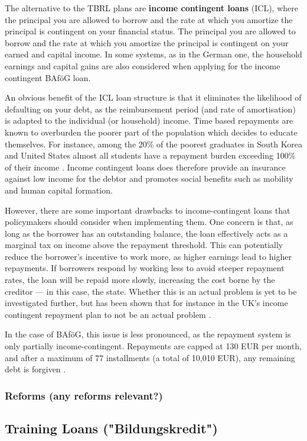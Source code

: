 The alternative to the TBRL plans are \textbf{income contingent loans} (ICL), where the 
principal you are allowed to borrow and the rate at which you amortize the principal is contingent on your financial status. The principal you are allowed to borrow and the 
rate at which you amortize the principal is contingent on your earned 
and capital income. In some systems, as in the German one, the household earnings 
and capital gains are also considered when applying for the income contingent BAföG loan.

An obvious benefit of the ICL loan structure is that it eliminates the likelihood 
of defaulting on your debt, as the reimbursement period 
(and rate of amortisation) is adapted to the individual (or household) income. 
Time based repayments are known to overburden the poorer part of the population which decides to 
educate themselves. For instance, among the 20\% of the poorest graduates in South Korea and United States 
almost all students have a repayment burden exceeding 100\% of their income 
\citep{chapman_income-contingent_2022}. 
Income contingent loans does therefore provide an insurance against low income for the debtor and promotes social benefits such as mobility and human capital formation.

However, there are some important drawbacks to income-contingent loans that policymakers should consider when implementing them. 
One concern is that, as long as the borrower has an outstanding balance, the loan effectively acts as a marginal tax on income above the repayment threshold. 
This can potentially reduce the borrower’s incentive to work more, as higher earnings lead to higher repayments. 
If borrowers respond by working less to avoid steeper repayment rates, the loan will be repaid more slowly, increasing the cost borne by the creditor — in this case, the state.
Whether this is an actual problem is yet to be investigated further, but has been
shown that for instance in the UK's income contingent repayment plan to not 
be an actual problem \citep{britton_income_2020}. 

In the case of BAföG, this issue is less pronounced, as the repayment system is only partially income-contingent. Repayments are capped at 130 EUR per month, and after a maximum of 77 installments (a total of 10,010 EUR), any remaining debt is forgiven \citep{studentenwerk_bafog}.



\subsubsection{Reforms (any reforms relevant?)} 
\label{subsection:reforms}

\subsection{Training Loans ("Bildungskredit")}

